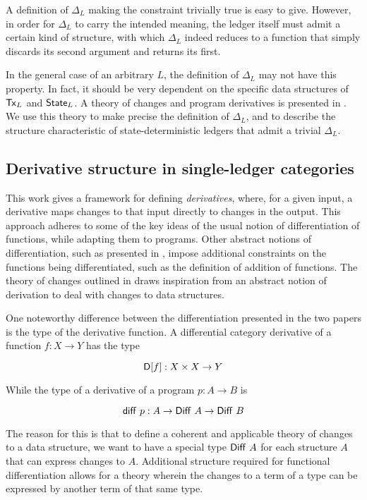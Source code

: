 A definition of $\Delta_L$ making the constraint trivially true is easy to give.
However, in order for $\Delta_L$ to carry the intended meaning, the ledger
itself must admit a certain kind of structure, with which $\Delta_L$ indeed reduces to a
function that simply discards its second argument and returns its first.

In the general case of an arbitrary $L$, the definition of $\Delta_L$ may not have
this property. In fact, it should be very dependent on the specific data structures
of $\mathsf{Tx}_L$ and $\mathsf{State}_L$. A theory of changes and program derivatives
is presented in \cite{changes}. We use this theory to make precise the definition of $\Delta_L$,
and to describe the structure characteristic
of state-deterministic ledgers that admit a trivial $\Delta_L$.

\subsection{Derivative structure in single-ledger categories}

This work gives a framework for defining \emph{derivatives}, where, for a given input,
a derivative maps changes to that input directly to changes in the output.
This approach adheres to some of the key ideas of the usual notion of differentiation
of functions, while adapting them to programs. Other abstract notions of differentiation,
such as presented in \cite{diffrestcats}, impose additional constraints on
the functions being differentiated, such as the definition of addition of functions.
The theory of changes outlined in \cite{changes} draws inspiration from an
abstract notion of derivation to deal with changes to data structures.

One noteworthy difference between the differentiation presented in the two papers is
the type of the derivative function. A differential category derivative of a
function $f : X \to Y$ has the type

\[ \mathsf{D}[f] : X \times X \to Y \]

While the type of a derivative of a program $p : A \to B$ is

\[ \mathsf{diff}~p : A \to \mathsf{Diff}~A \to \mathsf{Diff}~B \]

The reason for this is that to define a coherent and applicable theory of changes
to a data structure, we want to have a special type $\mathsf{Diff}~A$ for each
structure $A$ that can express changes to $A$. Additional structure required
for functional differentiation allows for a theory wherein the changes to a term of a type
can be expressed by another term of that same type.

